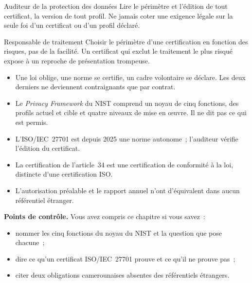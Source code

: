 \begin{boxmetier}{Auditeur de la protection des données}
Lire le périmètre et l'édition de tout certificat, la version de tout
profil. Ne jamais coter \OUI{} une exigence légale sur la seule foi d'un
certificat ou d'un profil déclaré.
\end{boxmetier}

\begin{boxmetier}{Responsable de traitement}
Choisir le périmètre d'une certification en fonction des risques, pas de la
facilité. Un certificat qui exclut le traitement le plus risqué expose à un
reproche de présentation trompeuse.
\end{boxmetier}

\begin{boxresume}
\begin{itemize}
    \item Une loi oblige, une norme se certifie, un cadre volontaire se
          déclare. Les deux derniers ne deviennent contraignants que par
          contrat.
    \item Le \textit{Privacy Framework} du NIST comprend un noyau de cinq
          fonctions, des profils actuel et cible et quatre niveaux de mise
          en œuvre. Il ne dit pas ce qui est permis.
    \item L'ISO/IEC~27701 est depuis 2025 une norme autonome~; l'auditeur
          vérifie l'édition du certificat.
    \item La certification de l'article~34 est une certification de
          conformité à la loi, distincte d'une certification ISO.
    \item L'autorisation préalable et le rapport annuel n'ont d'équivalent
          dans aucun référentiel étranger.
\end{itemize}
\end{boxresume}

\begin{boxinfo}
\textbf{Points de contrôle.} Vous avez compris ce chapitre si vous savez~:
\begin{itemize}
    \item nommer les cinq fonctions du noyau du NIST et la question que pose
          chacune~;
    \item dire ce qu'un certificat ISO/IEC~27701 prouve et ce qu'il ne
          prouve pas~;
    \item citer deux obligations camerounaises absentes des référentiels
          étrangers.
\end{itemize}
\end{boxinfo}

